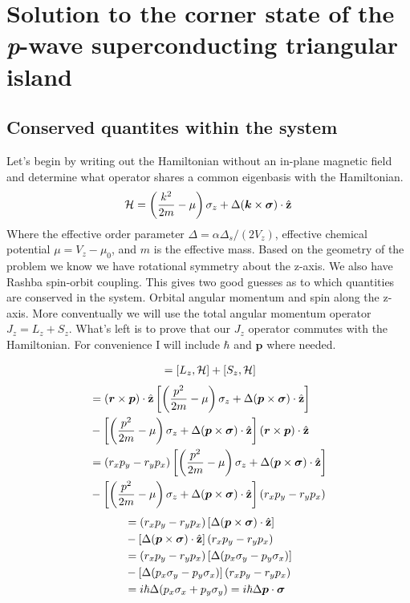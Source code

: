 \chapter{Solution to the corner state of the \textit{p}-wave superconducting triangular island}
\section{Conserved quantites within the system}

Let's begin by writing out the Hamiltonian without an in-plane magnetic field and determine what operator shares a common eigenbasis with the Hamiltonian.
\begin{equation}
  \Ham = \left(\dfrac{k^2}{2m} - \mu\right) \sz + \Delta (\bm{k} \times \bm{\sigma}) \cdot \hat{z}
\end{equation}
Where the effective order parameter $\Delta = \alpha\Delta_s/(2V_z)$, effective chemical potential $\mu = V_z-\mu_0$, and $m$ is the effective mass. 
Based on the geometry of the problem we know we have rotational symmetry about the z-axis. 
We also have Rashba spin-orbit coupling.
This gives two good guesses as to which quantities are conserved in the system.
Orbital angular momentum and spin along the z-axis. 
More conventually we will use the total angular momentum operator $J_z = L_z + S_z$.
What's left is to prove that our $J_z$ operator commutes with the Hamiltonian.
For convenience I will include $\hbar$ and $\bm{p}$ where needed.

\begin{align*}
  [J_z,\Ham] &= [L_z,\Ham] + [S_z,\Ham] \\
\end{align*}
\begin{align*}
  [L_z,\Ham] &= (\bm{r}\times\bm{p})\cdot\hat{z}\left[\left(\dfrac{p^2}{2m} - \mu\right) \sz + \Delta (\bm{p} \times \bm{\sigma}) \cdot \hat{z}\right] \\ 
  &-\left[\left(\dfrac{p^2}{2m} - \mu\right) \sz + \Delta (\bm{p} \times \bm{\sigma}) \cdot \hat{z}\right](\bm{r}\times\bm{p})\cdot\hat{z} \\
  &= (r_xp_y-r_yp_x)\left[\left(\dfrac{p^2}{2m} - \mu\right) \sz + \Delta (\bm{p} \times \bm{\sigma}) \cdot \hat{z}\right] \\ 
  &-\left[\left(\dfrac{p^2}{2m} - \mu\right) \sz + \Delta (\bm{p} \times \bm{\sigma}) \cdot \hat{z}\right](r_xp_y-r_yp_x) \\
\end{align*}
\begin{align*}
  &= (r_xp_y-r_yp_x)\left[\Delta (\bm{p} \times \bm{\sigma}) \cdot \hat{z}\right] \\ 
  &-\left[\Delta (\bm{p} \times \bm{\sigma}) \cdot \hat{z}\right](r_xp_y-r_yp_x) \\
  &= (r_xp_y-r_yp_x)\left[\Delta (p_x\sy-p_y\sx)\right] \\ 
  &-\left[\Delta (p_x\sy-p_y\sx)\right](r_xp_y-r_yp_x) \\
  &= i\hbar\Delta (p_x\sx + p_y\sy) = i\hbar\Delta\bm{p}\cdot\bm{\sigma}
\end{align*}

